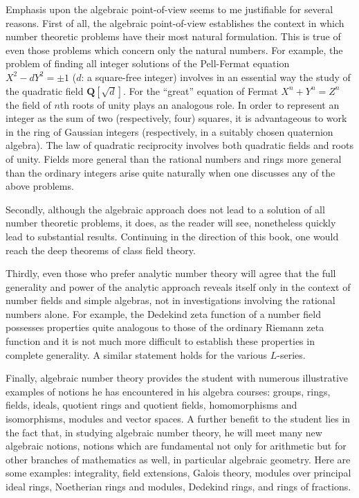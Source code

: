 Emphasis upon the algebraic point-of-view seems to me justifiable for
several reasons. First of all, the algebraic point-of-view establishes the
context in which number theoretic problems have their most natural
formulation. This is true of even those problems which concern only the
natural numbers. For example, the problem of finding all integer solutions
of the Pell-Fermat equation $X^{2}-dY^{2}=\pm1$ ($d$: a square-free integer)
involves in an essential way the study of the quadratic field
$\mathbf{Q}[\sqrt{d}]$. For the ``great'' equation of Fermat
$X^{n}+Y^{n}=Z^{n}$ the field of $n$th roots of unity plays an analogous
role. In order to represent an integer as the sum of two (respectively,
four) squares, it is advantageous to work in the ring of Gaussian integers
(respectively, in a suitably chosen quaternion algebra). The law of
quadratic reciprocity involves both quadratic fields and roots of unity.
Fields more general than the rational numbers and rings more general than
the ordinary integers arise quite naturally when one discusses any of the
above problems.

Secondly, although the algebraic approach does not lead to a solution of all
number theoretic problems, it does, as the reader will see, nonetheless
quickly lead to substantial results. Continuing in the direction of this
book, one would reach the deep theorems of class field theory.

Thirdly, even those who prefer analytic number theory will agree that the
full generality and power of the analytic approach reveals itself only in
the context of number fields and simple algebras, not in investigations
involving the rational numbers alone. For example, the Dedekind zeta
function of a number field possesses properties quite analogous to those of
the ordinary Riemann zeta function and it is not much more difficult to
establish these properties in complete generality. A similar statement holds
for the various $L$-series.

Finally, algebraic number theory provides the student with numerous
illustrative examples of notions he has encountered in his algebra courses:
groups, rings, fields, ideals, quotient rings and quotient fields,
homomorphisms and isomorphisms, modules and vector spaces. A further benefit
to the student lies in the fact that, in studying algebraic number theory,
he will meet many new algebraic notions, notions which are fundamental not
only for arithmetic but for other branches of mathematics as well, in
particular algebraic geometry. Here are some examples: integrality, field
extensions, Galois theory, modules over principal ideal rings, Noetherian
rings and modules, Dedekind rings, and rings of fractions.

